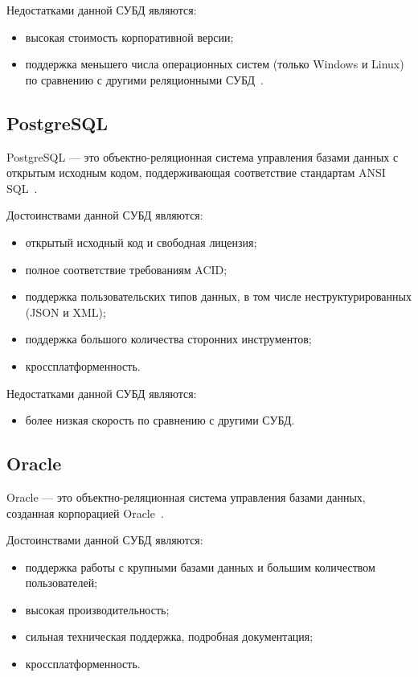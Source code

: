 Недостатками данной СУБД являются:
\begin{itemize}
    \item высокая стоимость корпоративной версии;
    \item поддержка меньшего числа операционных систем (только Windows
        и Linux) по сравнению с другими реляционными СУБД~\cite{art07}.
\end{itemize}

\subsection{PostgreSQL}

PostgreSQL --- это объектно-реляционная система управления базами данных с
открытым исходным кодом, поддерживающая соответствие стандартам ANSI
SQL~\cite{site08}.

Достоинствами данной СУБД являются:
\begin{itemize}
    \item открытый исходный код и свободная лицензия;
    \item полное соответствие требованиям ACID;
    \item поддержка пользовательских типов данных, в том числе
        неструктурированных (JSON и XML);
    \item поддержка большого количества сторонних инструментов;
    \item кроссплатформенность.
\end{itemize}

Недостатками данной СУБД являются:
\begin{itemize}
    \item более низкая скорость по сравнению с другими СУБД.
\end{itemize}

\subsection{Oracle}

Oracle --- это объектно-реляционная система управления базами данных, созданная
корпорацией Oracle~\cite{site09}.

Достоинствами данной СУБД являются:
\begin{itemize}
    \item поддержка работы с крупными базами данных и большим количеством
        пользователей;
    \item высокая производительность;
    \item сильная техническая поддержка, подробная документация;
    \item кроссплатформенность.
\end{itemize}

